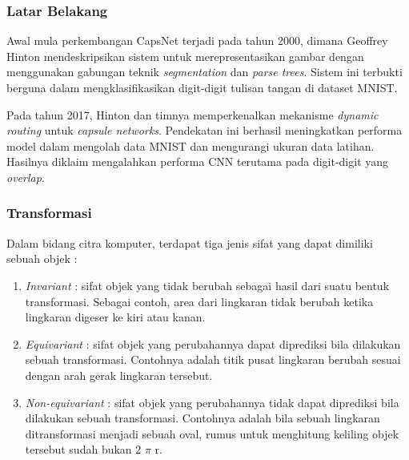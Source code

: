 \documentclass{article}
\begin{document}
	   	\subsubsection{Latar Belakang}
	   	Awal mula perkembangan CapsNet terjadi pada tahun 2000, dimana Geoffrey Hinton mendeskripsikan sistem untuk merepresentasikan gambar dengan menggunakan gabungan teknik \textit{segmentation} dan \textit{parse trees}. Sistem ini terbukti berguna dalam mengklasifikasikan digit-digit tulisan tangan di dataset MNIST. 
	   	\par
	   	Pada tahun 2017, Hinton dan timnya memperkenalkan mekanisme \textit{dynamic routing}\cite{hinton} untuk \textit{capsule networks}. Pendekatan ini berhasil meningkatkan performa model dalam mengolah data MNIST dan mengurangi ukuran data latihan. Hasilnya diklaim mengalahkan performa CNN terutama pada digit-digit yang \textit{overlap}.
	   	
	   	\subsubsection{Transformasi}
	   	Dalam bidang citra komputer, terdapat tiga jenis sifat yang dapat dimiliki sebuah objek : 
	   	
	   	\begin{enumerate}
	   	 \item \textit{Invariant} : sifat objek yang tidak berubah sebagai hasil dari suatu bentuk transformasi. Sebagai contoh, area dari lingkaran tidak berubah ketika lingkaran digeser ke kiri atau kanan.
	   	 \item \textit{Equivariant} : sifat objek yang perubahannya dapat diprediksi bila dilakukan sebuah transformasi. Contohnya adalah titik pusat lingkaran berubah sesuai dengan arah gerak lingkaran tersebut.
	   	 \item \textit{Non-equivariant} : sifat objek yang perubahannya tidak dapat diprediksi bila dilakukan sebuah transformasi. Contohnya adalah bila sebuah lingkaran ditransformasi menjadi sebuah oval, rumus untuk menghitung keliling objek tersebut sudah bukan 2 $\pi$ r. 
	   	\end{enumerate}
	   	
\end{document}
